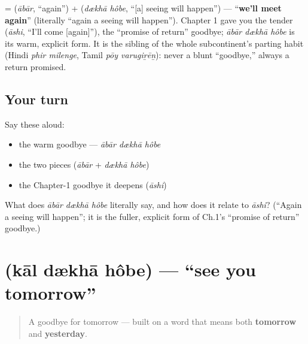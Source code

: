 \begin{cousinweb}
\textbf{  } = \textbf{} (\emph{ābār}, \textquotedblleft{}again\textquotedblright{}) + \textbf{ } (\emph{dækhā hôbe}, \textquotedblleft{}{[}a{]} seeing will happen\textquotedblright{}) — \textquotedblleft{}\textbf{we'll meet again}\textquotedblright{} (literally \textquotedblleft{}again a seeing will happen\textquotedblright{}). Chapter 1 gave you the tender \textbf{} (\emph{āshi}, \textquotedblleft{}I'll come {[}again{]}\textquotedblright{}), the \textquotedblleft{}promise of return\textquotedblright{} goodbye; \emph{ābār dækhā hôbe} is its warm, explicit form. It is the sibling of the whole subcontinent's parting habit (Hindi \emph{phir milenge}, Tamil \emph{pōy varugiṟēṉ}): never a blunt \textquotedblleft{}goodbye,\textquotedblright{} always a return promised.
\end{cousinweb}

\subsection*{Your turn}
Say these aloud:

\begin{itemize}
\raggedright
  \item the warm goodbye — \emph{ābār dækhā hôbe}
  \item the two pieces (\emph{ābār} + \emph{dækhā hôbe})
  \item the Chapter-1 goodbye it deepens (\emph{āshi})
\end{itemize}

\begin{tcolorbox}[breakable,colback=teal!4,colframe=teal!35!black,title={Before you move on}]
What does \emph{ābār dækhā hôbe} literally say, and how does it relate to \emph{āshi}? (\textquotedblleft{}Again a seeing will happen\textquotedblright{}; it is the fuller, explicit form of Ch.1's \textquotedblleft{}promise of return\textquotedblright{} goodbye.)
\end{tcolorbox}
\section[\bn{কাল} \bn{দেখা} \bn{হবে}]{   (kāl dækhā hôbe) — \textquotedblleft{}see you tomorrow\textquotedblright{}}

\label{lesson:BN-C04-kal-dekha-hobe}



\begin{quote}
A goodbye for tomorrow — built on a word that means both \textbf{tomorrow} and \textbf{yesterday}.
\end{quote}

